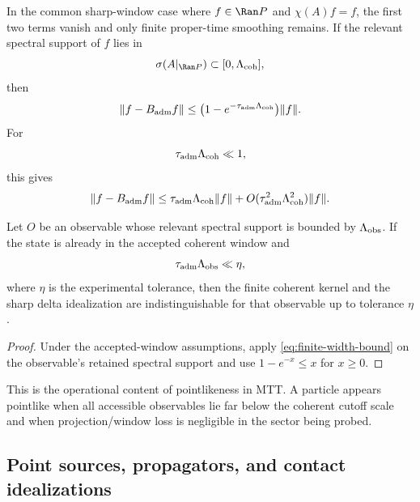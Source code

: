 \documentclass[11pt]{article}
\begin{document}
In the common sharp-window case where \(f\in\Ran P\) and \(\chi(A)f=f\), the first two
terms vanish and only finite proper-time smoothing remains. If the relevant spectral support
of \(f\) lies in
\begin{equation}
  \sigma(A|_{\Ran P})\subset[0,\Lambda_{\rm coh}],
\end{equation}
then
\begin{equation}
  \|f-B_{\rm adm}f\|
  \le
  \bigl(1-e^{-\tau_{\rm adm}\Lambda_{\rm coh}}\bigr)\|f\|.
  \label{eq:finite-width-bound}
\end{equation}
For
\begin{equation}
  \tau_{\rm adm}\Lambda_{\rm coh}\ll1,
\end{equation}
this gives
\begin{equation}
  \|f-B_{\rm adm}f\|
  \le
  \tau_{\rm adm}\Lambda_{\rm coh}\|f\|
  +
  O(\tau_{\rm adm}^2\Lambda_{\rm coh}^2)\|f\|.
  \label{eq:small-tau-bound}
\end{equation}

\begin{proposition}
\label{prop:resolution-criterion}
Let \(O\) be an observable whose relevant spectral support is bounded by
\(\Lambda_{\rm obs}\). If the state is already in the accepted coherent window and
\begin{equation}
  \tau_{\rm adm}\Lambda_{\rm obs}\ll \eta,
  \label{eq:resolution-eta}
\end{equation}
where \(\eta\) is the experimental tolerance, then the finite coherent kernel and the sharp
delta idealization are indistinguishable for that observable up to tolerance \(\eta\).
\end{proposition}

\begin{proof}
Under the accepted-window assumptions, apply \eqref{eq:finite-width-bound} on the
observable's retained spectral support and use \(1-e^{-x}\le x\) for \(x\ge0\).
\end{proof}

This is the operational content of pointlikeness in MTT. A particle appears pointlike when
all accessible observables lie far below the coherent cutoff scale and when projection/window
loss is negligible in the sector being probed.

\subsection{Point sources, propagators, and contact idealizations}
\label{subsec:point-sources-propagators}
\end{document}
